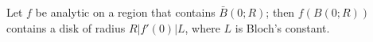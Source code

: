 Let $f$ be analytic on a region that contains $\bar{B}(0; R)$; then $f(B(0; R))$ contains a disk of radius $R |f'(0)| L$, where $L$ is Bloch's constant.
